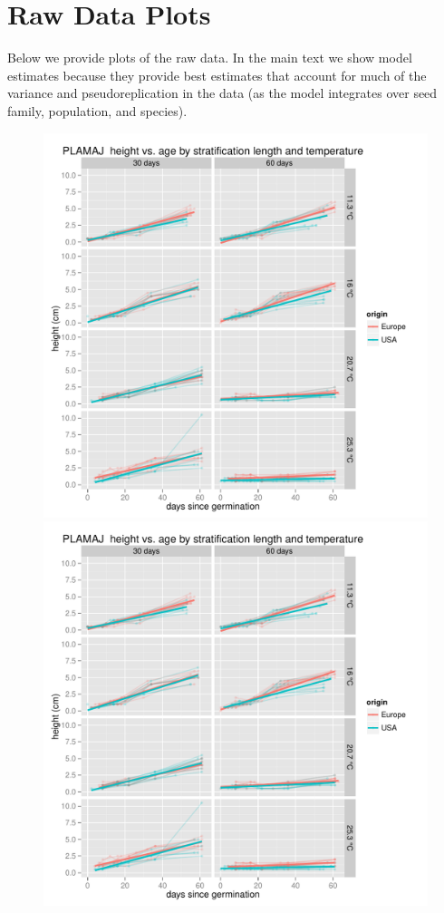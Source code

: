 \documentclass[12pt]{article}\usepackage[]{graphicx}\usepackage[]{color}
\begin{document}
\section{Raw Data Plots}
Below we provide plots of the raw data. In the main text we show model estimates because they provide best estimates that account for much of the variance and pseudoreplication in the data (as the model integrates over seed family, population, and species). %
\begin{figure}[H]
  \centering
  {\includegraphics[scale=.5, page=7, trim=0cm 0cm 3cm 1.2cm, clip=TRUE]{supplement.pdf}}
  {\includegraphics[scale=.5, page=3, trim=0cm 0cm 3cm 1.2cm, clip=TRUE]{supplement.pdf}}

\end{figure}
\end{document}
